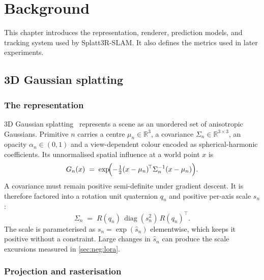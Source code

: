 \chapter{Background}
\label{ch:bg}

This chapter introduces the representation, renderer, prediction models, and
tracking system used by Splatt3R-SLAM. It also defines the metrics used in
later experiments.

\section{3D Gaussian splatting}
\label{sec:bg:3dgs}

\subsection{The representation}

3D Gaussian splatting~\cite{kerbl20233dgs} represents a scene as an unordered
set of anisotropic Gaussians. Primitive $n$ carries a centre
$\mu_n\in\mathbb{R}^3$, a covariance $\Sigma_n\in\mathbb{R}^{3\times3}$, an
opacity $\alpha_n\in(0,1)$ and a view-dependent colour encoded as
spherical-harmonic coefficients. Its unnormalised spatial influence at a
world point $x$ is
\begin{equation}
G_n(x) \;=\; \exp\!\Bigl(-\tfrac{1}{2}(x-\mu_n)^{\!\top}\Sigma_n^{-1}(x-\mu_n)\Bigr).
\label{eq:gaussian}
\end{equation}
A covariance must remain positive semi-definite under gradient descent.
It is therefore factored into a rotation
unit quaternion $q_n$ and positive per-axis scale $s_n$:
\begin{equation}
\Sigma_n \;=\; R(q_n)\,\operatorname{diag}(s_n^2)\,R(q_n)^\top .
\label{eq:cov}
\end{equation}
The scale is parameterised as $s_n=\exp(\hat{s}_n)$ elementwise, which keeps
it positive without a constraint. Large changes in $\hat{s}_n$ can produce the
scale excursions measured in \cref{sec:neg:lora}.

\subsection{Projection and rasterisation}

